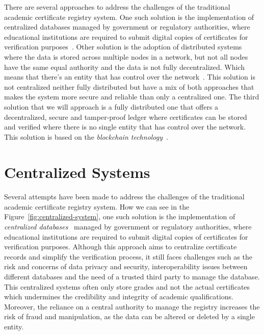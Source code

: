 There are several approaches to address the challenges of the traditional academic certificate registry system. One such solution is the implementation of centralized databases managed by government or regulatory authorities,
where educational institutions are required to submit digital copies of certificates for verification purposes~\cite{LinWays}.
Other solution is the adoption of distributed systems where the data is stored across multiple nodes in a network, but not all nodes have the same equal authority and the data is not fully decentralized. Which means that there's an entity that has control over the network~\cite{sharples2016blockchain}.
This solution is not centralized neither fully distributed but have a mix of both approaches that makes the system more secure and reliable than only a centralized one.
The third solution that we will approach is a fully distributed one that offers a decentralized, secure and tamper-proof ledger where certificates can be stored and verified where
there is no single entity that has control over the network. This solution is based on the \textit{blockchain technology}~\cite{app14020706, saleh2020blockchain}.

\section{Centralized Systems}\label{subsec:centralized-systems}
\paragraph{}

Several attempts have been made to address the challenges of the traditional academic certificate registry system.
How we can see in the Figure~\ref{fig:centralized-system}, one such solution is the implementation of \textit{centralized databases}~\cite{OLSON200971} managed by government or regulatory authorities, where educational institutions are required to
submit digital copies of certificates for verification purposes. Although this approach aims to centralize certificate records and simplify the verification process, it still faces challenges
such as the risk and concerns of data privacy and security, interoperability issues between different databases and the need of a trusted third party to manage the database.
This centralized systems often only store grades and not the actual certificates which undermines the credibility and integrity of academic qualifications.
Moreover, the reliance on a central authority to manage the registry increases the risk of fraud and manipulation, as the data can be altered or deleted by a single entity.

